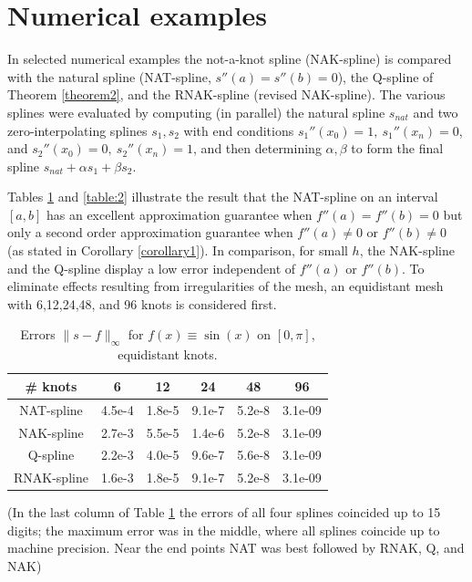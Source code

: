 \documentclass[12pt]{article}
\begin{document}
\section{Numerical examples}\label{section.numeric}

In selected numerical examples the not-a-knot spline (NAK-spline)
is compared with the natural spline (NAT-spline, $s''(a)=s''(b)=0$), the 
Q-spline of Theorem \ref{theorem2}, and the RNAK-spline
(revised NAK-spline). The various splines were evaluated by
computing (in parallel) the natural spline $s_{nat}$ and two
zero-interpolating splines $s_1,s_2$ with end conditions 
$s_1''(x_0)=1,\ s_1''(x_n)=0$, and $s_2''(x_0)=0,\ s_2''(x_n)=1$,
and then determining $\alpha,\beta$ to form the final spline
$s_{nat}+\alpha s_1+\beta s_2$.


Tables \ref{table:1} and \ref{table:2} illustrate
the result that the NAT-spline on an interval $[a,b]$
has an excellent approximation guarantee when $f''(a)=f''(b)=0$
but only a second order approximation guarantee
when $f''(a)\not=0$ or $f''(b)\not=0$ (as stated in Corollary \ref{corollary1}).
In comparison, for small $h$, the NAK-spline and the Q-spline display a low error
independent of $f''(a)$ or $f''(b)$. To eliminate effects resulting from irregularities of the mesh,
an equidistant mesh with 6,12,24,48, and 96 knots is considered first.

\vfill

\begin{table}[!h]
\centering
\begin{tabular}{| c| c| c| c| c| c|} 
 \hline
 \# knots & 6 & 12 & 24 & 48 & 96 \\ [0.5ex] 
 \hline\hline
 NAT-spline & 4.5e-4 & 1.8e-5 & 9.1e-7 & 5.2e-8 & 3.1e-09 \\ 
 NAK-spline & 2.7e-3 & 5.5e-5 & 1.4e-6 & 5.2e-8 & 3.1e-09 \\ 
 Q-spline   & 2.2e-3 & 4.0e-5 & 9.6e-7 & 5.6e-8 & 3.1e-09 \\ 
 RNAK-spline& 1.6e-3 & 1.8e-5 & 9.1e-7 & 5.2e-8 & 3.1e-09 \\ 
\hline
\end{tabular}
\caption{Errors $\|s-f \|_\infty$ for $f(x)\equiv \sin(x)$ on $[0,\pi]$, equidistant knots.}
\label{table:1}
\end{table}

(In the last column of Table \ref{table:1} the errors of all four splines
coincided up to 15 digits; the maximum error was in the middle,
where all splines coincide up to machine precision. Near the end points
NAT was best followed by RNAK, Q, and NAK)
\end{document}
